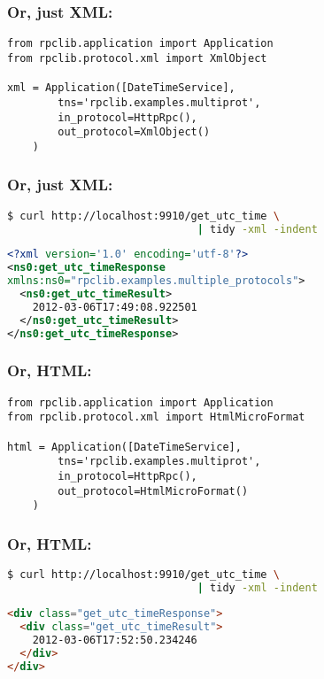 \documentclass{beamer}
\begin{document}
\begin{frame}[fragile]    
  \frametitle{Or, just XML:}

  \begin{lstlisting}
from rpclib.application import Application
from rpclib.protocol.xml import XmlObject

xml = Application([DateTimeService],
        tns='rpclib.examples.multiprot',
        in_protocol=HttpRpc(),
        out_protocol=XmlObject()
    )
  \end{lstlisting}
\end{frame}


\begin{frame}[fragile]    
  \frametitle{Or, just XML:}

  \begin{lstlisting}[language=sh,frame=topline]
$ curl http://localhost:9910/get_utc_time \
                              | tidy -xml -indent
  \end{lstlisting}
  \small
  \begin{lstlisting}[language=xml,frame=bottomline]
<?xml version='1.0' encoding='utf-8'?>
<ns0:get_utc_timeResponse 
xmlns:ns0="rpclib.examples.multiple_protocols">
  <ns0:get_utc_timeResult>
    2012-03-06T17:49:08.922501
  </ns0:get_utc_timeResult>
</ns0:get_utc_timeResponse>
  \end{lstlisting}
\end{frame}

\begin{frame}[fragile]    
  \frametitle{Or, HTML:}

  \begin{lstlisting}
from rpclib.application import Application
from rpclib.protocol.xml import HtmlMicroFormat

html = Application([DateTimeService],
        tns='rpclib.examples.multiprot',
        in_protocol=HttpRpc(),
        out_protocol=HtmlMicroFormat()
    )
  \end{lstlisting}
\end{frame}


\begin{frame}[fragile]    
  \frametitle{Or, HTML:}

  \begin{lstlisting}[language=sh,frame=topline]
$ curl http://localhost:9910/get_utc_time \
                              | tidy -xml -indent
  \end{lstlisting}
  \begin{lstlisting}[language=html, frame=bottomline]
<div class="get_utc_timeResponse">
  <div class="get_utc_timeResult">
    2012-03-06T17:52:50.234246
  </div>
</div>
  \end{lstlisting}
\end{frame}
\end{document}
